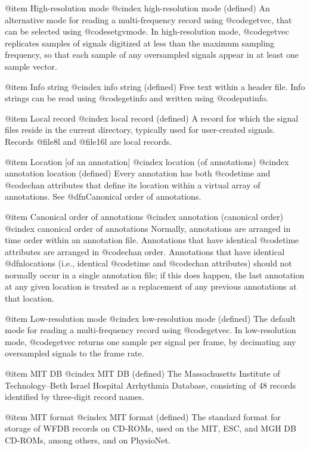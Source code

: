 {{{{{{{{{@item High-resolution mode
@cindex high-resolution mode (defined)
An alternative mode for reading a multi-frequency record using
@code{getvec}, that can be selected using @code{setgvmode}.  In
high-resolution mode, @code{getvec} replicates samples of signals
digitized at less than the maximum sampling frequency, so that each
sample of any oversampled signals appear in at least one sample vector.

@item Info string
@cindex info string (defined)
Free text within a header file.  Info strings can be read using
@code{getinfo} and written using @code{putinfo}.

@item Local record
@cindex local record (defined)
A record for which the signal files reside in the current directory,
typically used for user-created signals.  Records @file{8l} and
@file{16l} are local records.

@item Location [of an annotation]
@cindex location (of annotations)
@cindex annotation location (defined)
Every annotation has both @code{time} and @code{chan} attributes that
define its location within a virtual array of annotations.  See
@dfn{Canonical order of annotations}.

@item Canonical order of annotations
@cindex annotation (canonical order)
@cindex canonical order of annotations
Normally, annotations are arranged in time order within an annotation file.
Annotations that have identical @code{time} attributes are arranged in
@code{chan} order.  Annotations that have identical @dfn{locations} (i.e.,
identical @code{time} and @code{chan} attributes) should not normally occur in
a single annotation file; if this does happen, the last annotation at any given
location is treated as a replacement of any previous annotations at that
location.

@item Low-resolution mode
@cindex low-resolution mode (defined)
The default mode for reading a multi-frequency record using
@code{getvec}.  In low-resolution mode, @code{getvec} returns one
sample per signal per frame, by decimating any oversampled signals
to the frame rate.

@item MIT DB
@cindex MIT DB (defined)
The Massachusetts Institute of Technology--Beth Israel Hospital
Arrhythmia Database, consisting of 48 records identified by three-digit
record names.

@item MIT format
@cindex MIT format (defined)
The standard format for storage of WFDB records on CD-ROMs, used on the
MIT, ESC, and MGH DB CD-ROMs, among others, and on PhysioNet.

}}}}}}}}}
